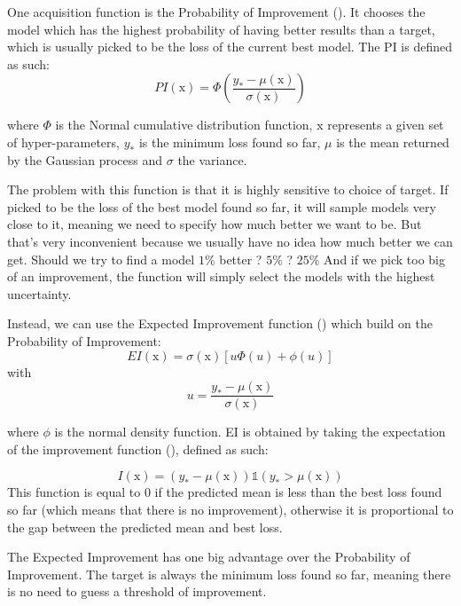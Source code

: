 One acquisition function is the Probability of Improvement (\textcite{kushner1964}). It chooses the model which has the highest probability of having better results than a target, which is usually picked to be the loss of the current best model. The PI is defined as such:
\begin{equation}
    PI(\mathrm{x}) = \Phi \left( \frac{y_* - \mu(\mathrm{x})}{\sigma(\mathrm{x})}\right)
\end{equation}

where $\Phi$ is the Normal cumulative distribution function, $\mathrm{x}$ represents a given set of hyper-parameters, $y_*$ is the minimum loss found so far, $\mu$ is the mean returned by the Gaussian process and $\sigma$ the variance.

The problem with this function is that it is highly sensitive to choice of target. If picked to be the loss of the best model found so far, it will sample models very close to it, meaning we need to specify how much better we want to be. But that's very inconvenient because we usually have no idea how much better we can get. Should we try to find a model $1 \%$ better ? $5 \%$ ? $25 \%$ And if we pick too big of an improvement, the function will simply select the models with the highest uncertainty.

Instead, we can use the Expected Improvement function (\textcite{schonlau1998}) which build on the Probability of Improvement:
\begin{equation}
	EI(\mathrm{x})  = \sigma (\mathrm{x}) [u\Phi(u)+\phi(u)]
\end{equation}
with
\begin{equation}
	u = \frac{y_* - \mu(\mathrm{x})}{\sigma(\mathrm{x})}
\end{equation}

where $\phi$ is the normal density function. EI is obtained by taking the expectation of the improvement function (\textcite{shahriari2016IEEE}), defined as such:

\begin{equation}
	I(\mathrm{x}) = \left(y_* - \mu(\mathrm{x}) \right) \mathds{1} \left(y_* > \mu(\mathrm{x}) \right)
\end{equation}
This function is equal to $0$ if the predicted mean is less than the best loss found so far (which means that there is no improvement), otherwise it is proportional to the gap between the predicted mean and best loss. 

The Expected Improvement has one big advantage over the Probability of Improvement. The target is always the minimum loss found so far, meaning there is no need to guess a threshold of improvement. 

